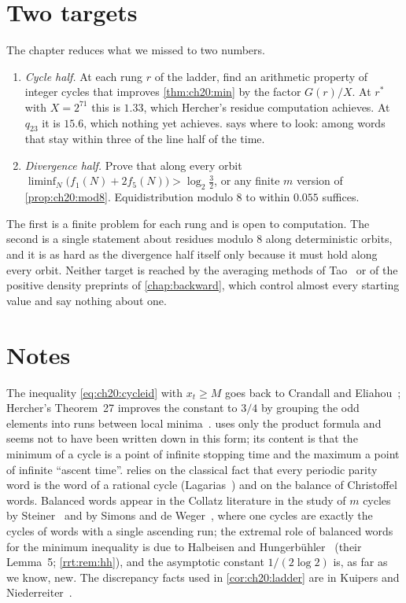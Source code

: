 \section{Two targets}\label{sec:ch20:targets}

The chapter reduces what we missed to two numbers.

\begin{enumerate}[label=(\arabic*)]
\item \textit{Cycle half.} At each rung $r$ of the ladder, find an arithmetic property of integer cycles that improves \cref{thm:ch20:min} by the factor $G(r)/X$. At $r^\ast$ with $X=2^{71}$ this is $1.33$, which Hercher's residue computation achieves. At $q_{23}$ it is $15.6$, which nothing yet achieves.  says where to look: among words that stay within three of the line half of the time.
\item \textit{Divergence half.} Prove that along every orbit $\liminf_N\bigl(f_1(N)+2f_5(N)\bigr)>\log_2\frac32$, or any finite $m$ version of \cref{prop:ch20:mod8}. Equidistribution modulo $8$ to within $0.055$ suffices.
\end{enumerate}

The first is a finite problem for each rung and is open to computation. The second is a single statement about residues modulo $8$ along deterministic orbits, and it is as hard as the divergence half itself only because it must hold along every orbit. Neither target is reached by the averaging methods of Tao~\cite{tao2022} or of the positive density preprints of \cref{chap:backward}, which control almost every starting value and say nothing about one.

\section*{Notes}

The inequality \eqref{eq:ch20:cycleid} with $x_t\ge M$ goes back to Crandall and Eliahou~\cite{crandall1978,eliahou1993}; Hercher's Theorem~27 improves the constant to $3/4$ by grouping the odd elements into runs between local minima~\cite{hercher2023}.  uses only the product formula and seems not to have been written down in this form; its content is that the minimum of a cycle is a point of infinite stopping time and the maximum a point of infinite ``ascent time''.  relies on the classical fact that every periodic parity word is the word of a rational cycle (Lagarias~\cite{lagarias1985}) and on the balance of Christoffel words. Balanced words appear in the Collatz literature in the study of $m$ cycles by Steiner~\cite{steiner1977} and by Simons and de Weger~\cite{simons2005}, where one cycles are exactly the cycles of words with a single ascending run; the extremal role of balanced words for the minimum inequality is due to Halbeisen and Hungerb\"uhler~\cite{halbeisen1997} (their Lemma~5; \cref{rrt:rem:hh}), and the asymptotic constant $1/(2\log2)$ is, as far as we know, new. The discrepancy facts used in \cref{cor:ch20:ladder} are in Kuipers and Niederreiter~\cite{kuipers1974}.

